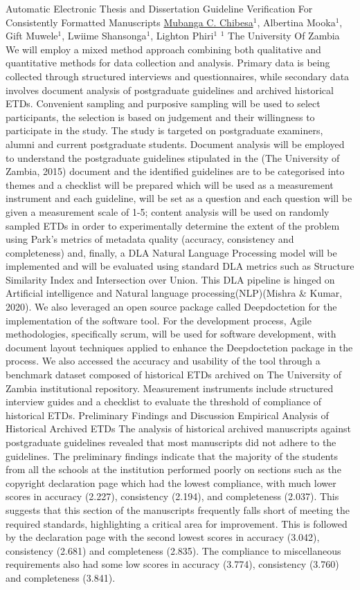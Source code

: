 \begin{abstract_online}{Automatic Electronic Thesis and Dissertation Guideline Verification For Consistently Formatted Manuscripts}{%
    \underline{Mubanga C. Chibesa}$^{1}$, Albertina Mooka$^{1}$, Gift Muwele$^{1}$, Lwiime Shansonga$^{1}$, Lighton Phiri$^{1}$}{%
    }{%
    $^1$ The University Of Zambia}
We will employ a mixed method approach  combining both qualitative and quantitative methods for data collection and analysis. Primary data is being collected through structured interviews and questionnaires, while secondary data involves  document analysis of postgraduate guidelines and archived historical ETDs. Convenient  sampling and purposive sampling  will be used to select participants, the selection is based on judgement and their willingness to participate in the study. The study is targeted on postgraduate examiners, alumni and current postgraduate students. Document analysis will be employed to understand the postgraduate guidelines stipulated in the (The University of Zambia, 2015) document and the identified guidelines are to be categorised into themes and a checklist will be prepared which will be used as a measurement instrument and each guideline, will be set as a question  and each question will be given a measurement scale of 1-5; content analysis will be used on randomly sampled ETDs in order to experimentally determine the extent of the problem using Park’s metrics of metadata quality (accuracy, consistency and completeness) and, finally, a DLA Natural Language Processing model will be implemented and will be evaluated using standard DLA metrics such as Structure Similarity Index and Intersection over Union.
This DLA pipeline is  hinged on Artificial intelligence and Natural language processing(NLP)(Mishra \& Kumar, 2020). We also  leveraged  an open source package called Deepdoctetion for the implementation of the software tool. 
For the development process, Agile methodologies, specifically scrum, will be used for software development, with document layout techniques applied to enhance the Deepdoctetion package in the process. We also accessed the accuracy and usability of the tool through a benchmark dataset composed of historical ETDs archived on The University of Zambia institutional repository. Measurement instruments include structured interview guides and a checklist to evaluate the threshold of compliance of historical ETDs.
Preliminary Findings  and Discussion
Empirical Analysis of Historical Archived ETDs
The analysis of historical archived manuscripts against postgraduate guidelines revealed that most manuscripts did not adhere to the guidelines. The preliminary findings indicate that the majority of the students from all the schools at the institution performed poorly on sections such as the copyright declaration page which had the lowest compliance, with much lower scores in accuracy (2.227), consistency (2.194), and completeness (2.037). This suggests that this section of the manuscripts frequently falls short of meeting the required standards, highlighting a critical area for improvement. This is followed by the declaration page with the second lowest scores in accuracy (3.042), consistency (2.681) and completeness (2.835). The compliance to miscellaneous requirements also had some low scores in accuracy (3.774), consistency (3.760) and completeness (3.841).

\end{abstract_online}
